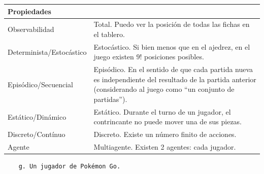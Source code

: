 \documentclass[11pt]{article}
\begin{document}
\begin{longtable}[]{@{}
  >{\raggedright\arraybackslash}p{}
  >{\raggedright\arraybackslash}p{}@{}}
\toprule\noalign{}
\begin{minipage}[b]{\linewidth}\raggedright
Propiedades
\end{minipage} & \begin{minipage}[b]{\linewidth}\raggedright
\end{minipage} \\
\midrule\noalign{}
\endhead
\bottomrule\noalign{}
\endlastfoot
Observabilidad & Total. Puedo ver la posición de todas las fichas en el
tablero. \\
Determinista/Estocástico & Estocástico. Si bien menos que en el ajedrez,
en el juego existen \(9!\) posiciones posibles. \\
Episódico/Secuencial & Episódico. En el sentido de que cada partida
nueva es independiente del resultado de la partida anterior
(considerando al juego como ``un conjunto de partidas''). \\
Estático/Dinámico & Estático. Durante el turno de un jugador, el
contrincante no puede mover una de sus piezas. \\
Discreto/Contínuo & Discreto. Existe un número finito de acciones. \\
Agente & Multiagente. Existen 2 agentes: cada jugador. \\
\end{longtable}

\begin{verbatim}
    g. Un jugador de Pokémon Go.
\end{verbatim}
\end{document}

